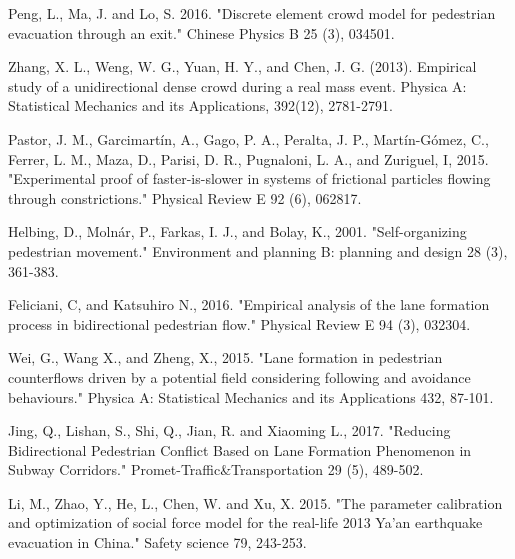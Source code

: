 \documentclass[preprint,12pt]{elsarticle}
\begin{document}
\begin{thebibliography}{10}
Peng, L., Ma, J. and Lo, S. 2016. "Discrete element crowd model for 
pedestrian evacuation through an exit." Chinese Physics B 25 (3), 034501.
{}

Zhang, X. L., Weng, W. G., Yuan, H. Y., and Chen, J. G. (2013). 
Empirical study of a unidirectional dense crowd during a real mass event. 
Physica A: Statistical Mechanics and its Applications, 392(12), 2781-2791.


Pastor, J. M., Garcimart\'in, A., Gago, P. A., Peralta, J. P., 
Mart\'in-Gómez, C., Ferrer, L. M., Maza, D., Parisi, D. R., Pugnaloni, L. A., 
and Zuriguel, I, 2015. "Experimental proof of faster-is-slower in systems of 
frictional particles flowing through constrictions." Physical Review E 92 (6), 
062817. {}


Helbing, D., Moln\'ar, P., Farkas, I. J., and Bolay, K., 2001. "Self-organizing 
pedestrian movement." Environment and planning B: planning and design 
28 (3), 361-383.
{}

Feliciani, C, and Katsuhiro N., 2016. "Empirical analysis of the lane 
formation process in bidirectional pedestrian flow." Physical Review E 94 
(3), 032304.
{}


Wei, G., Wang X., and Zheng, X., 2015. "Lane formation in pedestrian 
counterflows driven by a potential field considering following and avoidance 
behaviours." Physica A: Statistical Mechanics and its Applications 432, 87-101.
{}

Jing, Q., Lishan, S., Shi, Q., Jian, R.  and Xiaoming L., 2017. 
"Reducing Bidirectional Pedestrian Conflict Based on Lane Formation Phenomenon 
in Subway Corridors." Promet-Traffic\&Transportation 29 (5), 489-502.
{}


Li, M., Zhao, Y., He, L., Chen, W. and Xu, X. 
2015. "The parameter calibration and optimization of social force model for the 
real-life 2013 Ya’an earthquake evacuation in China." Safety science 79, 
243-253.
{}

\end{thebibliography}
\end{document}
